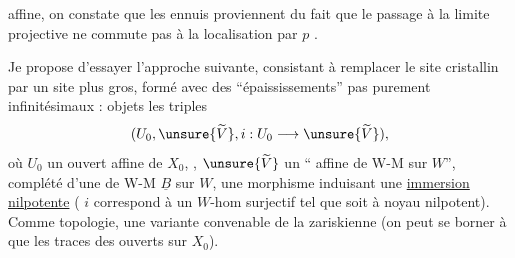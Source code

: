 affine, on constate que les ennuis proviennent du fait que le passage à la limite projective ne commute pas à la localisation par $p$
.

Je propose d'essayer l'approche suivante, consistant à remplacer le site cristallin par un site plus gros, formé avec des ``épaississements'' pas purement infinitésimaux : objets les triples
\[
(U_0,\unsure{\widetilde V},i:U_0\longrightarrow\unsure{\widetilde V}),
\]
où $U_0$ un ouvert affine de $X_0$, , $\unsure{\widetilde V}$ un `` affine de W-M sur $W$'',  complété d'une  de W-M $\underline B$ sur $W$,
une  morphisme  induisant une \uline{immersion nilpotente}
( $i$ correspond à un $W$-hom surjectif
tel que
soit à noyau nilpotent).
Comme topologie, une variante convenable de la zariskienne (on peut se borner à  que les traces des ouverts sur $X_0$).
